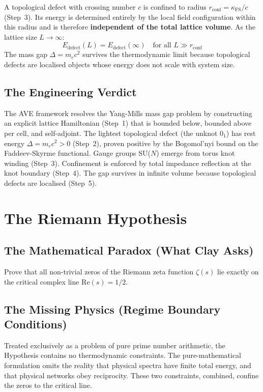 A topological defect with crossing number $c$ is confined to radius $r_\mathrm{conf} = \kappa_\mathrm{FS}/c$ (Step~3). Its energy is determined entirely by the local field configuration within this radius and is therefore \textbf{independent of the total lattice volume}. As the lattice size $L \to \infty$:
\begin{equation}
    E_\mathrm{defect}(L) = E_\mathrm{defect}(\infty) \quad \text{for all } L \gg r_\mathrm{conf}
\end{equation}
The mass gap $\Delta = m_e c^2$ survives the thermodynamic limit because topological defects are localised objects whose energy does not scale with system size.

\subsection{The Engineering Verdict}
The AVE framework resolves the Yang-Mills mass gap problem by constructing an explicit lattice Hamiltonian (Step~1) that is bounded below, bounded above per cell, and self-adjoint. The lightest topological defect (the unknot $0_1$) has rest energy $\Delta = m_e c^2 > 0$ (Step~2), proven positive by the Bogomol'nyi bound on the Faddeev-Skyrme functional. Gauge groups SU($N$) emerge from torus knot winding (Step~3). Confinement is enforced by total impedance reflection at the knot boundary (Step~4). The gap survives in infinite volume because topological defects are localised (Step~5).

\section{The Riemann Hypothesis}
\label{sec:rh_millennium}

\subsection{The Mathematical Paradox (What Clay Asks)}
Prove that all non-trivial zeros of the Riemann zeta function $\zeta(s)$ lie exactly on the critical complex line $\mathrm{Re}(s) = 1/2$.

\subsection{The Missing Physics (Regime Boundary Conditions)}
Treated exclusively as a problem of pure prime number arithmetic, the Hypothesis contains no thermodynamic constraints. The pure-mathematical formulation omits the reality that physical spectra have finite total energy, and that physical networks obey reciprocity. These two constraints, combined, confine the zeros to the critical line.

